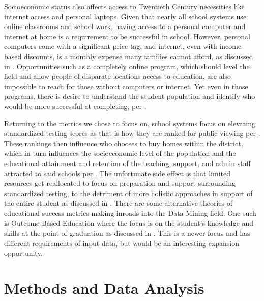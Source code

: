 \documentclass[man,floatsintext]{apa6} %
\begin{document}
Socioeconomic status also affects access to Twentieth Century necessities like internet access and personal laptops. Given that nearly all school systems use online classrooms and school work, having access to a personal computer and internet at home is a requirement to be successful in school. However, personal computers come with a significant price tag, and internet, even with income-based discounts, is a monthly expense many families cannot afford, as discussed in \cite{sesinternet}. Opportunities such as a completely online program, which should level the field and allow people of disparate locations access to education, are also impossible to reach for those without computers or internet. Yet even in those programs, there is desire to understand the student population and identify who would be more successful at completing, per \cite{DistLearnML}.

Returning to the metrics we chose to focus on, school systems focus on elevating standardized testing scores as that is how they are ranked for public viewing per \cite{linnetal}. These rankings then influence who chooses to buy homes within the district, which in turn influences the socioeconomic level of the population and the educational attainment and retention of the teaching, support, and admin staff attracted to said schools per \cite{perry2010does}. The unfortunate side effect is that limited resources get reallocated to focus on preparation and support surrounding standardized testing, to the detriment of more holistic approaches in support of the entire student as discussed in \cite{cradle}. There are some alternative theories of educational success metrics making inroads into the Data Mining field. One such is Outcome-Based Education where the focus is on the student's knowledge and skills at the point of graduation as discussed in \cite{studentPerfOBE}. This is a newer focus and has different requirements of input data, but would be an interesting expansion opportunity. 

\section{Methods and Data Analysis}
\end{document}
